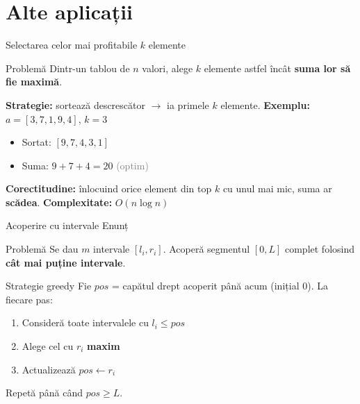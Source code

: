 \documentclass{beamer}
\begin{document}
\section{Alte aplicații}

\begin{frame}{Selectarea celor mai profitabile $k$ elemente}
  \begin{block}{Problemă}
    Dintr-un tablou de $n$ valori, alege $k$ elemente astfel încât
    \textbf{suma lor să fie maximă}.
  \end{block}
  \smallskip
  \textbf{Strategie:} sortează descrescător $\rightarrow$ ia primele $k$ elemente.
  \smallskip
  \textbf{Exemplu:} $a = [3, 7, 1, 9, 4]$, $k = 3$
  \begin{itemize}
    \item Sortat: $[9, 7, 4, 3, 1]$
    \item Suma: $9 + 7 + 4 = 20$ \quad \textcolor{gray}{(optim)}
  \end{itemize}
  \smallskip
  \textbf{Corectitudine:} înlocuind orice element din top $k$
  cu unul mai mic, suma ar \textbf{scădea}.
  \smallskip
  \textbf{Complexitate:} $O(n \log n)$
\end{frame}

\begin{frame}{Acoperire cu intervale \textemdash{} Enunț}
  \begin{block}{Problemă}
    Se dau $m$ intervale $[l_i, r_i]$.
    Acoperă segmentul $[0, L]$ complet
    folosind \textbf{cât mai puține intervale}.
  \end{block}
  \smallskip
  \begin{block}{Strategie greedy}
    Fie $\mathit{pos}$ = capătul drept acoperit până acum (inițial $0$).
    La fiecare pas:
    \begin{enumerate}
      \item Consideră toate intervalele cu $l_i \leq \mathit{pos}$
      \item Alege cel cu $r_i$ \textbf{maxim}
      \item Actualizează $\mathit{pos} \leftarrow r_i$
    \end{enumerate}
    Repetă până când $\mathit{pos} \geq L$.
  \end{block}
\end{frame}
\end{document}
